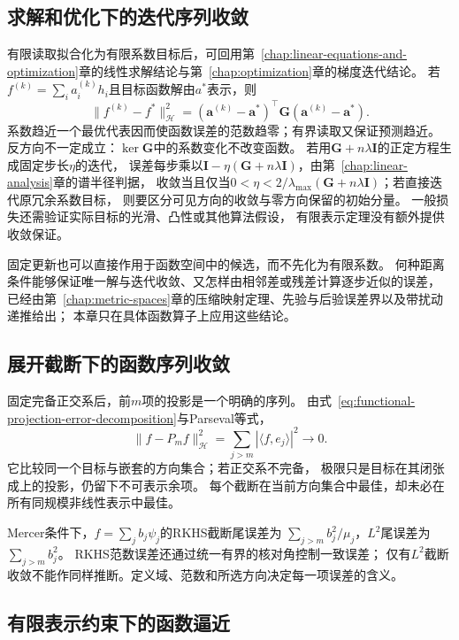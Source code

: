 \subsection{求解和优化下的迭代序列收敛}
\label{sec:functional-iteration-convergence}

有限读取拟合化为有限系数目标后，可回用第~\ref{chap:linear-equations-and-optimization}章的线性求解结论与第~\ref{chap:optimization}章的梯度迭代结论。
若$f^{(k)}=\sum_i a_i^{(k)}h_i$且目标函数解由$a^*$表示，则
\[
 \lVert f^{(k)}-f^*\rVert_{\mathcal H}^2
 =(\bm a^{(k)}-\bm a^*)^\top\bm G(\bm a^{(k)}-\bm a^*).
\]
系数趋近一个最优代表因而使函数误差的范数趋零；有界读取又保证预测趋近。
反方向不一定成立：$\ker\bm G$中的系数变化不改变函数。
若用$\bm G+n\lambda\bm I$的正定方程生成固定步长$\eta$的迭代，
误差每步乘以$\bm I-\eta(\bm G+n\lambda\bm I)$，由第~\ref{chap:linear-analysis}章的谱半径判据，
收敛当且仅当$0<\eta<2/\lambda_{\max}(\bm G+n\lambda\bm I)$；若直接迭代原冗余系数目标，
则要区分可见方向的收敛与零方向保留的初始分量。
一般损失还需验证实际目标的光滑、凸性或其他算法假设，
有限表示定理没有额外提供收敛保证。

固定更新也可以直接作用于函数空间中的候选，而不先化为有限系数。
何种距离条件能够保证唯一解与迭代收敛、又怎样由相邻差或残差计算逐步近似的误差，
已经由第~\ref{chap:metric-spaces}章的压缩映射定理、先验与后验误差界以及带扰动递推给出；
本章只在具体函数算子上应用这些结论。

\subsection{展开截断下的函数序列收敛}
\label{sec:functional-truncation-convergence}

固定完备正交系后，前$m$项的投影是一个明确的序列。
由式~\eqref{eq:functional-projection-error-decomposition}与Parseval等式，
\[
 \lVert f-P_mf\rVert_{\mathcal H}^2
 =\sum_{j>m}|\langle f,e_j\rangle|^2\to0.
\]
它比较同一个目标与嵌套的方向集合；若正交系不完备，
极限只是目标在其闭张成上的投影，仍留下不可表示余项。
每个截断在当前方向集合中最佳，却未必在所有同规模非线性表示中最佳。

Mercer条件下，$f=\sum_j b_j\psi_j$的RKHS截断尾误差为
$\sum_{j>m}b_j^2/\mu_j$，$L^2$尾误差为$\sum_{j>m}b_j^2$。
RKHS范数误差还通过统一有界的核对角控制一致误差；
仅有$L^2$截断收敛不能作同样推断。定义域、范数和所选方向决定每一项误差的含义。

\subsection{有限表示约束下的函数逼近}
\label{sec:functional-approximation-capacity-representation}

